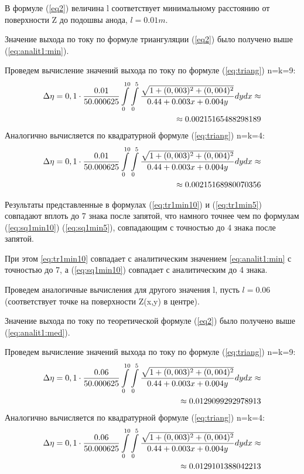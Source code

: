 \documentclass{article}
\begin{document}
В формуле (\ref{eq2}) величина l соответствует минимальному расстоянию от поверхности Z до подошвы анода, $l=0.01 m$.

Значение выхода по току по формуле триангуляции (\ref{eq2}) было получено выше (\ref{eq:analit1:min}).

Проведем вычисление значений выхода по току по формуле (\ref{eq:triang}) n=k=9:
\begin{align} \label{eq:tr1min10}
\Delta \eta = 0,1 \cdot \frac{0.01}{50.000625} \int\limits_0^{10} \int\limits_0^5 \frac{\sqrt{1+(0,003)^2+(0,004)^2}}{0.44 + 0.003x + 0.004y} dy dx \approx \notag \\ \approx 0.00215165488298189
\end{align}
Аналогично вычисляется по квадратурной формуле (\ref{eq:triang}) n=k=4:
\begin{align} \label{eq:tr1min5}
\Delta \eta = 0,1 \cdot \frac{0.01}{50.000625} \int\limits_0^{10} \int\limits_0^5 \frac{\sqrt{1+(0,003)^2+(0,004)^2}}{0.44 + 0.003x + 0.004y} dy dx \approx \notag \\ \approx 0.00215168980070356
\end{align}

Результаты представленные в формулах (\ref{eq:tr1min10}) и (\ref{eq:tr1min5}) совпадают вплоть до 7 знака после запятой, что намного точнее чем по формулам (\ref{eq:sq1min10}) (\ref{eq:sq1min5}), совпадающим с точностью до 4 знака после запятой.

При этом \ref{eq:tr1min10} совпадает с аналитическим значением \ref{eq:analit1:min} с точностью до 7, а (\ref{eq:sq1min10}) совпадает с аналитическим до 4 знака.

Проведем аналогичные вычисления для другого значения l, пусть $l=0.06$ (соответствует точке на поверхности Z(x,y) в центре).

Значение выхода по току по теоретической формуле (\ref{eq2}) было получено выше (\ref{eq:analit1:med}).

Проведем вычисление значений выхода по току по формуле (\ref{eq:triang}) n=k=9:
\begin{align}\label{eq:tr1med10}
\Delta \eta = 0,1 \cdot \frac{0.06}{50.000625} \int\limits_0^{10} \int\limits_0^5 \frac{\sqrt{1+(0,003)^2+(0,004)^2}}{0.44 + 0.003x + 0.004y} dy dx \approx \notag \\ \approx 0.0129099292978913
\end{align}
Аналогично вычисляется по квадратурной формуле (\ref{eq:triang}) n=k=4:
\begin{align}\label{eq:tr1med5}
\Delta \eta = 0,1 \cdot \frac{0.06}{50.000625} \int\limits_0^{10} \int\limits_0^5 \frac{\sqrt{1+(0,003)^2+(0,004)^2}}{0.44 + 0.003x + 0.004y} dy dx \approx \notag \\ \approx 0.0129101388042213
\end{align}
\end{document}
